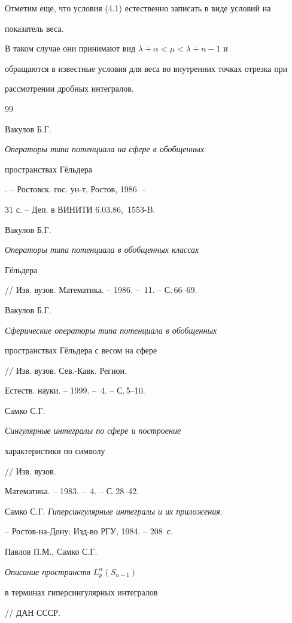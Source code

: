 Отметим еще, что условия (4.1) естественно записать в виде условий на


показатель веса.


В таком случае они принимают вид $ \lambda +\alpha< \mu <\lambda+n-1$ и


обращаются в известные условия для веса во внутренних точках отрезка при


рассмотрении дробных интегралов.





\begin{thebibliography}{99}







Вакулов Б.Г. {\it Операторы типа потенциала на сфере в обобщенных


пространствах Г\"ельдера}. -- Ростовск. гос. ун-т, Ростов, 1986. --


31 с. -- Деп. в ВИНИТИ 6.03.86, \No\,1553-B.




Вакулов Б.Г. {\it Операторы типа потенциала в обобщенных классах


Г\"ельдера} // Изв. вузов. Математика. -- 1986. -- \No\,11. -- С.\,66--69.




Вакулов Б.Г. {\it Сферические операторы типа потенциала в обобщенных


пространствах Г\"ельдера с весом на сфере} // Изв. вузов. Сев.-Кавк. Регион.


Естеств. науки. -- 1999. -- \No\,4. -- С.\,5--10.




Самко С.Г. {\it Сингулярные интегралы по сфере и построение


характеристики по символу} // Изв. вузов.


Математика. -- 1983. -- \No\,4. -- С.\,28--42.




Самко С.Г. {\it Гиперсингулярные интегралы и их приложения}.


-- Ростов-на-Дону: Изд-во РГУ, 1984. -- 208~с.




Павлов П.М., Самко С.Г. {\it Описание пространств $L_p^\alpha (S_{n-1})$


в терминах гиперсингулярных интегралов} // ДАН СССР.



\end{thebibliography}
